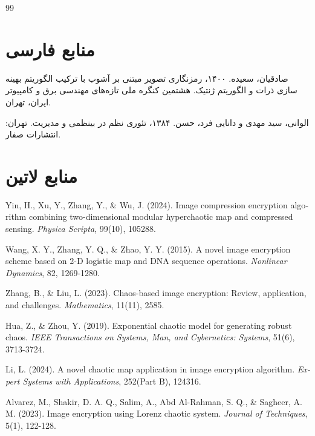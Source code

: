 
\begin{thebibliography}{99}

\section*{منابع فارسی}

 صادقیان، سعیده. ۱۴۰۰، رمزنگاری تصویر مبتنی بر آشوب با ترکیب الگوریتم بهینه سازی ذرات و الگوریتم ژنتیک. هشتمین کنگره ملی تازه‌های مهندسی برق و کامپیوتر ایران، تهران.

 الوانی، سید مهدی و دانایی فرد، حسن. ۱۳۸۴، تئوری نظم در بینظمی و مدیریت. تهران: انتشارات صفار.

\section*{منابع لاتین}

\begin{LTRbibitems}
\begin{latin}
 Yin, H., Xu, Y., Zhang, Y., \& Wu, J. (2024). Image compression encryption algorithm combining two-dimensional modular hyperchaotic map and compressed sensing. \textit{Physica Scripta}, 99(10), 105288.

 Wang, X. Y., Zhang, Y. Q., \& Zhao, Y. Y. (2015). A novel image encryption scheme based on 2-D logistic map and DNA sequence operations. \textit{Nonlinear Dynamics}, 82, 1269-1280.

 Zhang, B., \& Liu, L. (2023). Chaos-based image encryption: Review, application, and challenges. \textit{Mathematics}, 11(11), 2585.

 Hua, Z., \& Zhou, Y. (2019). Exponential chaotic model for generating robust chaos. \textit{IEEE Transactions on Systems, Man, and Cybernetics: Systems}, 51(6), 3713-3724.

 Li, L. (2024). A novel chaotic map application in image encryption algorithm. \textit{Expert Systems with Applications}, 252(Part B), 124316.

 Alvarez, M., Shakir, D. A. Q., Salim, A., Abd Al-Rahman, S. Q., \& Sagheer, A. M. (2023). Image encryption using Lorenz chaotic system. \textit{Journal of Techniques}, 5(1), 122-128.


\end{latin}
\end{LTRbibitems}
\end{thebibliography}
